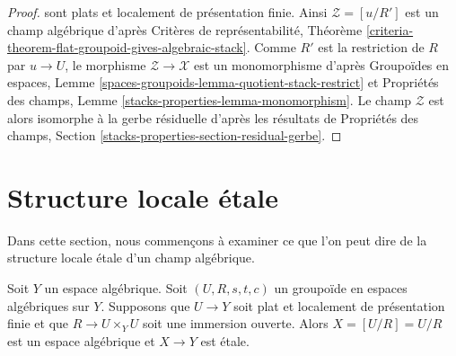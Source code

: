 \begin{proof}
sont plats et localement de présentation finie. Ainsi
$\mathcal{Z} = [u/R']$ est un champ algébrique d'après Critères de
représentabilité, Théorème
\ref{criteria-theorem-flat-groupoid-gives-algebraic-stack}.
Comme $R'$ est la restriction de $R$ par $u \to U$, le morphisme
$\mathcal{Z} \to \mathcal{X}$ est un monomorphisme d'après Groupoïdes en
espaces, Lemme
\ref{spaces-groupoids-lemma-quotient-stack-restrict}
et Propriétés des champs, Lemme
\ref{stacks-properties-lemma-monomorphism}.
Le champ $\mathcal{Z}$ est alors isomorphe à la gerbe résiduelle d'après les
résultats de Propriétés des champs, Section
\ref{stacks-properties-section-residual-gerbe}.
\end{proof}













\section{Structure locale \'etale}
\label{section-etale-local}

\noindent
Dans cette section, nous commen\c{c}ons \`a examiner ce que l'on peut dire
de la structure locale \'etale d'un champ alg\'ebrique.

\begin{lemma}
\label{lemma-quotient-etale}
Soit $Y$ un espace alg\'ebrique.
Soit $(U, R, s, t, c)$ un groupo\"ide en espaces alg\'ebriques sur $Y$.
Supposons que $U \to Y$ soit plat et localement de pr\'esentation finie
et que $R \to U \times_Y U$ soit une immersion ouverte.
Alors $X = [U/R] = U/R$ est un espace alg\'ebrique et $X \to Y$
est \'etale.
\end{lemma}

